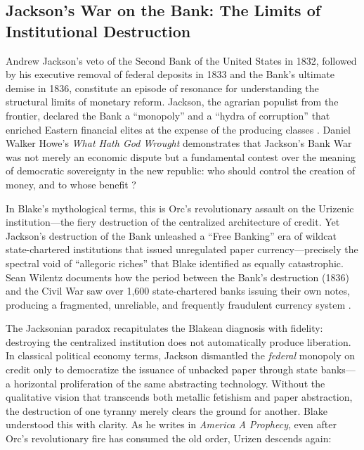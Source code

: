 \documentclass[
]{article}
\begin{document}
\subsection{Jackson's War on the Bank: The Limits of Institutional
Destruction}\label{jacksons-war-on-the-bank-the-limits-of-institutional-destruction}

Andrew Jackson's veto of the Second Bank of the United States in 1832,
followed by his executive removal of federal deposits in 1833 and the
Bank's ultimate demise in 1836, constitute an episode of resonance for
understanding the structural limits of monetary reform. Jackson, the
agrarian populist from the frontier, declared the Bank a ``monopoly''
and a ``hydra of corruption'' that enriched Eastern financial elites at
the expense of the producing classes
\citep{howe2007what, wilentz2005rise}. Daniel Walker Howe's \emph{What
Hath God Wrought} demonstrates that Jackson's Bank War was not merely an
economic dispute but a fundamental contest over the meaning of
democratic sovereignty in the new republic: who should control the
creation of money, and to whose benefit \citep{howe2007what}?

In Blake's mythological terms, this is Orc's revolutionary assault on
the Urizenic institution---the fiery destruction of the centralized
architecture of credit. Yet Jackson's destruction of the Bank unleashed
a ``Free Banking'' era of wildcat state-chartered institutions that
issued unregulated paper currency---precisely the spectral void of
``allegoric riches'' that Blake identified as equally catastrophic. Sean
Wilentz documents how the period between the Bank's destruction (1836)
and the Civil War saw over 1,600 state-chartered banks issuing their own
notes, producing a fragmented, unreliable, and frequently fraudulent
currency system \citep{wilentz2005rise}.

The Jacksonian paradox recapitulates the Blakean diagnosis with
fidelity: destroying the centralized institution does not automatically
produce liberation. In classical political economy terms, Jackson
dismantled the \emph{federal} monopoly on credit only to democratize the
issuance of unbacked paper through state banks---a horizontal
proliferation of the same abstracting technology. Without the
qualitative vision that transcends both metallic fetishism and paper
abstraction, the destruction of one tyranny merely clears the ground for
another. Blake understood this with clarity. As he writes in
\emph{America A Prophecy}, even after Orc's revolutionary fire has
consumed the old order, Urizen descends again:
\end{document}
